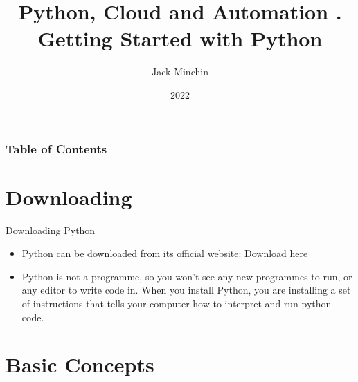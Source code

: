 \documentclass[aspectratio=169]{beamer}
\title{\large{\textbf{Python, Cloud and Automation}} \newline\newline 2. Getting Started with Python}
\author{Jack Minchin}
\institute{Tourism Economics}
\date{2022}
\begin{document}
\frame{\titlepage}

\begin{frame}
\frametitle{Table of Contents}
\tableofcontents
\end{frame}

\section{Downloading}
\begin{frame}{Downloading Python}

\begin{itemize}
	\item Python can be downloaded from its official website:
\href{https://www.python.org/downloads/release/python-3104/}{Download here}

\item Python is not a programme, so you won't see any new programmes to run, or any editor to write code in. When you install Python, you are installing a set of instructions that tells your computer how to interpret and run python code. 

\end{itemize}

	
\end{frame}



\section{Basic Concepts}
\end{document}
